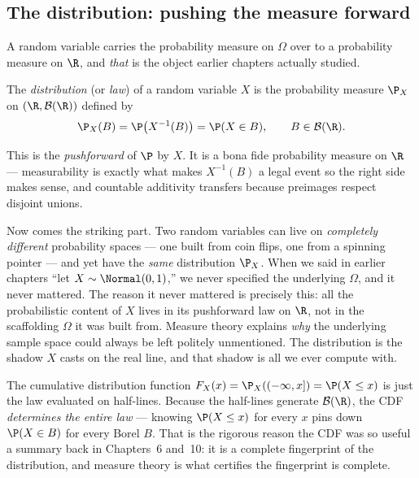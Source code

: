 \subsection{The distribution: pushing the measure forward}

A random variable carries the probability measure on $\Omega$ over to a
probability measure on $\R$, and \emph{that} is the object earlier chapters
actually studied.

\begin{definition}
\label{ch36:law}
The \emph{distribution} (or \emph{law}) of a random variable $X$ is the
probability measure $\P_X$ on $(\R, \mathcal{B}(\R))$ defined by
\[
  \P_X(B) = \P\big(X^{-1}(B)\big) = \P(X \in B),
  \qquad B \in \mathcal{B}(\R).
\]
\end{definition}

This is the \emph{pushforward} of $\P$ by $X$. It is a bona fide probability
measure on $\R$ --- measurability is exactly what makes $X^{-1}(B)$ a legal event
so the right side makes sense, and countable additivity transfers because preimages
respect disjoint unions.

\begin{aestheticbox}
Now comes the striking part. Two random variables can live on \emph{completely
different} probability spaces --- one built from coin flips, one from a spinning
pointer --- and yet have the \emph{same} distribution $\P_X$. When we said in
earlier chapters ``let $X \sim \Normal(0,1)$,'' we never specified the underlying
$\Omega$, and it never mattered. The reason it never mattered is precisely this:
all the probabilistic content of $X$ lives in its pushforward law on $\R$, not in
the scaffolding $\Omega$ it was built from. Measure theory explains \emph{why} the
underlying sample space could always be left politely unmentioned. The
distribution is the shadow $X$ casts on the real line, and that shadow is all we
ever compute with.
\end{aestheticbox}

\begin{connectionbox}
The cumulative distribution function $F_X(x) = \P_X((-\infty, x]) = \P(X \le x)$ is
just the law evaluated on half-lines. Because the half-lines generate
$\mathcal{B}(\R)$, the CDF \emph{determines the entire law} --- knowing
$\P(X \le x)$ for every $x$ pins down $\P(X \in B)$ for every Borel $B$. That is the
rigorous reason the CDF was so useful a summary back in Chapters~6 and~10: it
is a complete fingerprint of the distribution, and measure theory is what
certifies the fingerprint is complete.
\end{connectionbox}

